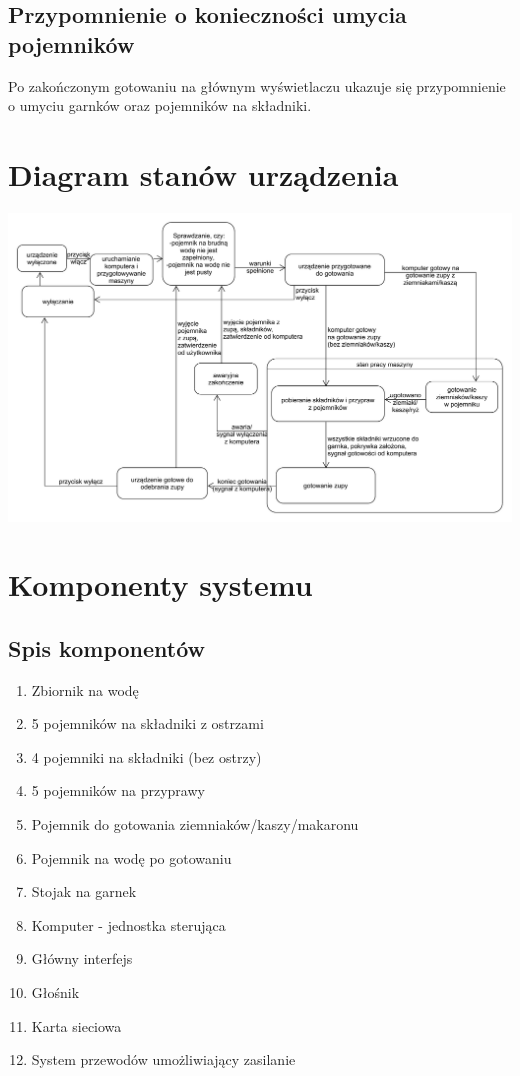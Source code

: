\documentclass[12pt,a4paper,notitlepage]{report}
\begin{document}
\subsection{Przypomnienie o konieczności umycia pojemników}
Po zakończonym gotowaniu na głównym wyświetlaczu ukazuje się przypomnienie o umyciu garnków oraz pojemników na składniki.

\section{Diagram stanów urządzenia}

\includegraphics[scale=0.16,width=\textwidth,height=\textheight,keepaspectratio=true]{Diagram-stanow-urzadzenie.pdf}


\newpage
\section{Komponenty systemu}

\subsection{Spis komponentów}
\begin{enumerate}
  \item Zbiornik na wodę
  \item 5 pojemników na składniki z ostrzami
  \item 4 pojemniki na składniki (bez ostrzy)
  \item 5 pojemników na przyprawy
  \item Pojemnik do gotowania ziemniaków/kaszy/makaronu
  \item Pojemnik na wodę po gotowaniu
  \item Stojak na garnek
  \item Komputer - jednostka sterująca
  \item Główny interfejs
  \item Głośnik
  \item Karta sieciowa
  \item System przewodów umożliwiający zasilanie
\end{enumerate}
\end{document}
